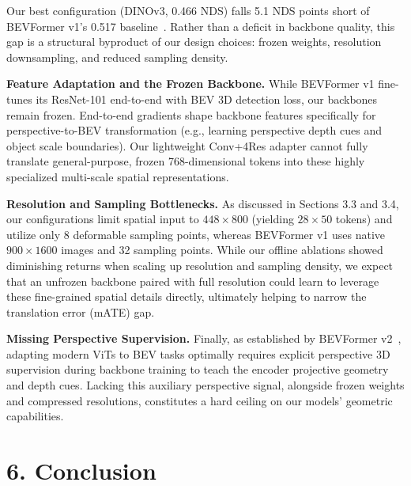 \documentclass[12pt]{article}
\begin{document}
Our best configuration (DINOv3, 0.466 NDS) falls 5.1 NDS points short of BEVFormer v1's 0.517 baseline~\cite{bevformer}. Rather than a deficit in backbone quality, this gap is a structural byproduct of our design choices: frozen weights, resolution downsampling, and reduced sampling density.

\textbf{Feature Adaptation and the Frozen Backbone.} While BEVFormer v1 fine-tunes its ResNet-101 end-to-end with BEV 3D detection loss, our backbones remain frozen. End-to-end gradients shape backbone features specifically for perspective-to-BEV transformation (e.g., learning perspective depth cues and object scale boundaries). Our lightweight Conv+4Res adapter cannot fully translate general-purpose, frozen 768-dimensional tokens into these highly specialized multi-scale spatial representations.

\textbf{Resolution and Sampling Bottlenecks.} As discussed in Sections 3.3 and 3.4, our configurations limit spatial input to $448 \times 800$ (yielding $28 \times 50$ tokens) and utilize only 8 deformable sampling points, whereas BEVFormer v1 uses native $900 \times 1600$ images and 32 sampling points. While our offline ablations showed diminishing returns when scaling up resolution and sampling density, we expect that an unfrozen backbone paired with full resolution could learn to leverage these fine-grained spatial details directly, ultimately helping to narrow the translation error (mATE) gap.

\textbf{Missing Perspective Supervision.} Finally, as established by BEVFormer v2~\cite{bevformerv2}, adapting modern ViTs to BEV tasks optimally requires explicit perspective 3D supervision during backbone training to teach the encoder projective geometry and depth cues. Lacking this auxiliary perspective signal, alongside frozen weights and compressed resolutions, constitutes a hard ceiling on our models' geometric capabilities.



\section{6. Conclusion}

\end{document}
